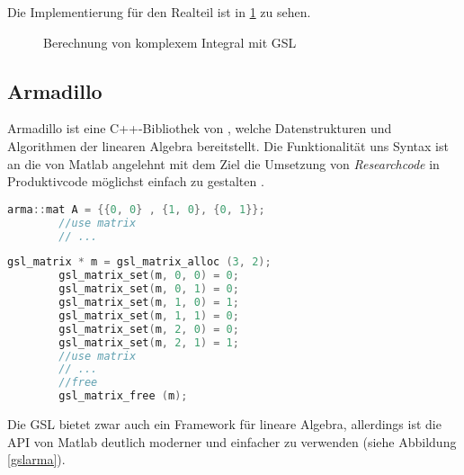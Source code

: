 Die Implementierung für den Realteil ist in \ref{integration_2d} zu sehen.

\begin{figure}
    
    \caption{Berechnung von komplexem Integral mit GSL}
    \label{integration_2d}
\end{figure}


\subsection{Armadillo}

Armadillo ist eine C++-Bibliothek von \citeauthor{armadillo}, welche Datenstrukturen und Algorithmen der linearen Algebra bereitstellt.
Die Funktionalität uns Syntax ist an die von Matlab angelehnt mit dem Ziel die Umsetzung von \textit{Researchcode} in Produktivcode möglichst einfach zu gestalten \cite{armadillo}.


\begin{center}
    \begin{lstlisting}[language=C++,style=cpp]
        arma::mat A = {{0, 0} , {1, 0}, {0, 1}};
        //use matrix 
        // ...
    \end{lstlisting}
    \begin{lstlisting}[language=C++,style=cpp]
        gsl_matrix * m = gsl_matrix_alloc (3, 2);
        gsl_matrix_set(m, 0, 0) = 0;
        gsl_matrix_set(m, 0, 1) = 0;
        gsl_matrix_set(m, 1, 0) = 1;
        gsl_matrix_set(m, 1, 1) = 0;
        gsl_matrix_set(m, 2, 0) = 0;
        gsl_matrix_set(m, 2, 1) = 1;
        //use matrix 
        // ...
        //free
        gsl_matrix_free (m);
    \end{lstlisting}
    \label{gslarma}
\end{center}

Die GSL bietet zwar auch ein Framework für lineare Algebra, allerdings ist die API von Matlab deutlich moderner und einfacher zu verwenden (siehe Abbildung \ref{gslarma}).





